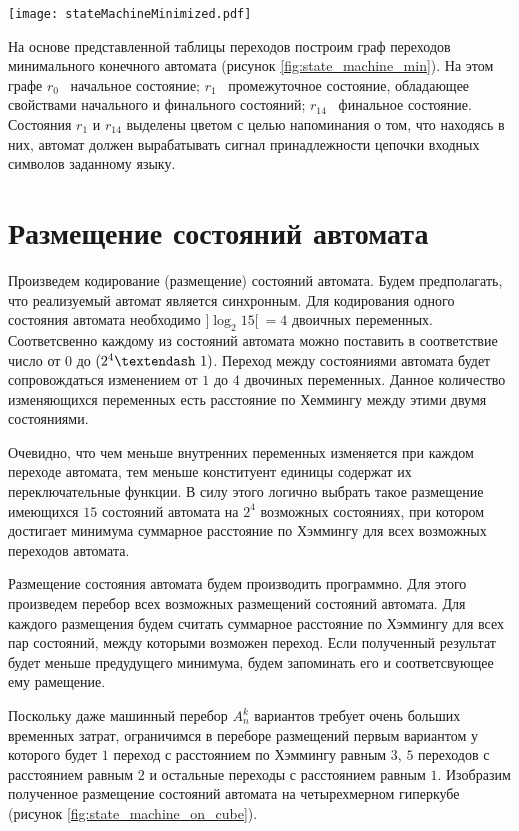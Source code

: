 \documentclass[a4paper,14pt,russian]{extarticle} %
\begin{document}
\begin{sidewaysfigure}
	\texttt{[image: stateMachineMinimized.pdf]}
	\caption{Граф переходов минимального автомата}
	\label{fig:state_machine_min}
\end{sidewaysfigure}

На основе представленной таблицы переходов построим граф переходов минимального конечного автомата (рисунок \ref{fig:state_machine_min}). На этом графе \(r_0\) \textendash\ начальное состояние; \(r_1\) \textendash\ промежуточное состояние, обладающее свойствами начального и финального состояний; \(r_{14}\) \textendash\ финальное состояние. Состояния \(r_1\) и \(r_{14}\) выделены цветом с целью напоминания о том, что находясь в них, автомат должен вырабатывать сигнал принадлежности цепочки входных символов заданному языку. 

\newpage
\section {Размещение состояний автомата}
Произведем кодирование (размещение) состояний автомата. Будем предполагать, что реализуемый автомат является синхронным. Для кодирования одного состояния автомата необходимо \(]\log_2 15[ \ = 4\) двоичных переменных. Соответсвенно каждому из состояний автомата можно поставить в соответствие число от \(0\) до \((2^4 \textendash\ 1)\). Переход между состояниями автомата будет сопровождаться изменением от \(1\) до \(4\) двочиных переменных. Данное количество изменяющихся переменных есть расстояние по Хеммингу между этими двумя состояниями. 

Очевидно, что чем меньше внутренних переменных изменяется при каждом переходе автомата, тем меньше конституент единицы содержат их переключательные функции. В силу этого логично выбрать такое размещение имеющихся \(15\) состояний автомата на \(2^4\) возможных состояниях, при котором достигает минимума суммарное расстояние по Хэммингу для всех возможных переходов автомата. 

Размещение состояния автомата будем производить программно. Для этого произведем перебор всех возможных размещений состояний автомата. Для каждого размещения будем считать суммарное расстояние по Хэммингу для всех пар состояний, между которыми возможен переход. Если полученный результат будет меньше предудущего минимума, будем запоминать его и соответсвующее ему рамещение. 

Поскольку даже машинный перебор \(A_n^k\) вариантов требует очень больших временных затрат, ограничимся в переборе размещений первым вариантом у которого будет \(1\) переход с расстоянием по Хэммингу равным \(3\), \(5\) переходов с расстоянием равным \(2\) и остальные переходы с расстоянием равным \(1\). 
Изобразим полученное размещение состояний автомата на четырехмерном гиперкубе (рисунок \ref{fig:state_machine_on_cube}).
\end{document}
